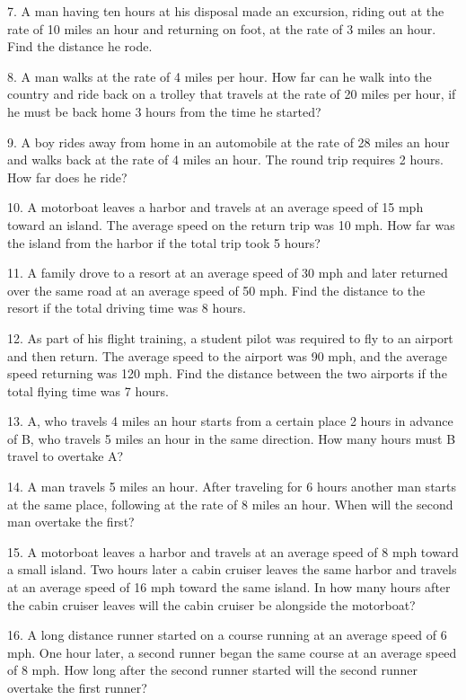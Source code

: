 \documentclass[11pt]{book}
\theoremstyle{definition}  %
\begin{document}
7. A man having ten hours at his disposal made an excursion, riding out at the
rate of 10 miles an hour and returning on foot, at the rate of
3 miles an hour. Find the distance he rode.

8. A man walks at the rate of 4 miles per hour. How far can he walk into the country and ride back on a trolley that travels at the rate
of 20 miles per hour, if he must be back home 3 hours from the time he
started?

9. A boy rides away from home in an automobile at the rate of 28 miles an hour
and walks back at the rate of 4 miles an hour. The round trip
requires 2 hours. How far does he ride?

10. A motorboat leaves a harbor and travels at an average speed of 15 mph toward an island. The average speed on the return trip
was 10 mph. How far was the island from the harbor if the total
trip took 5 hours?

11. A family drove to a resort at an average speed of 30 mph and later
returned over the same road at an average speed of 50 mph.
Find the distance to the resort if the total driving time was
8 hours.

12. As part of his flight training, a student pilot was required to fly to an
airport and then return. The average speed to the airport was 90
mph, and the average speed returning was 120 mph.
Find the distance between the two airports if the total
flying time was 7 hours.

13. A, who travels 4 miles an hour starts from a certain place 2 hours in
advance of B, who travels 5 miles an hour in the same direction.
How many hours must B travel to overtake A?

14. A man travels 5 miles an hour. After traveling for 6 hours another man
starts at the same place, following at the rate of 8 miles an hour.
When will the second man overtake the first?

15. A motorboat leaves a harbor and travels at an average speed of 8 mph
toward a small island. Two hours later a cabin cruiser leaves the
same harbor and travels at an average speed of 16 mph
toward the same island. In how many hours after the cabin
cruiser leaves will the cabin cruiser be alongside the motorboat?

16. A long distance runner started on a course running at an average speed of
6 mph. One hour later, a second runner began the same course
at an average speed of 8 mph. How long after the second
runner started will the second runner overtake the first
runner?
\end{document}
